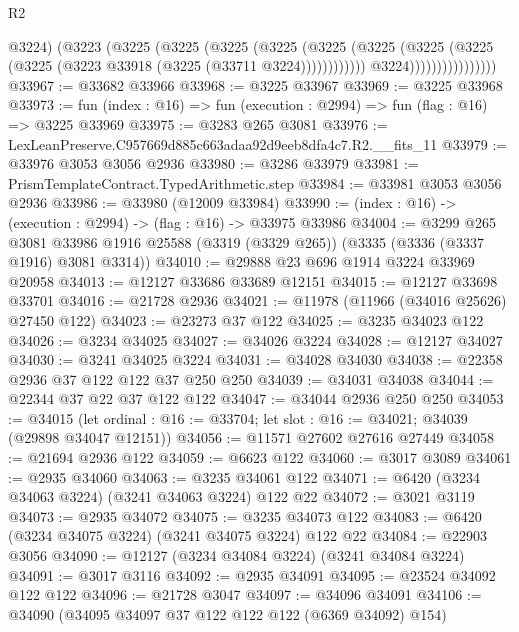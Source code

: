 \begin{lexlean}{R2}
\begin{coremodule}
                                    @3224)
                                  (@3223
                                    (@3225
                                      (@3225
                                        (@3225
                                          (@3225
                                            (@3225
                                              (@3225
                                                (@3225
                                                  (@3225
                                                    (@3225
                                                      (@3223 @33918 (@3225 (@33711 @3224))))))))))))
                                    @3224))))))))))))))))
@33967 := @33682 @33966
@33968 := @3225 @33967
@33969 := @3225 @33968
@33973 := fun (index : @16) => fun (execution : @2994) => fun (flag : @16) => @3225 @33969
@33975 := @3283 @265 @3081
@33976 := LexLeanPreserve.C957669d885c663adaa92d9eeb8dfa4c7.R2.__fits_11
@33979 := @33976 @3053 @3056 @2936
@33980 := @3286 @33979
@33981 := PrismTemplateContract.TypedArithmetic.step
@33984 := @33981 @3053 @3056 @2936
@33986 := @33980 (@12009 @33984)
@33990 := (index : @16) -> (execution : @2994) -> (flag : @16) -> @33975 @33986
@34004 := @3299
    @265
    @3081
    @33986
    @1916
    @25588
    (@3319 (@3329 @265))
    (@3335 (@3336 (@3337 @1916) @3081 @3314))
@34010 := @29888 @23 @696 @1914 @3224 @33969 @20958
@34013 := @12127 @33686 @33689 @12151
@34015 := @12127 @33698 @33701
@34016 := @21728 @2936
@34021 := @11978 (@11966 (@34016 @25626) @27450 @122)
@34023 := @23273 @37 @122
@34025 := @3235 @34023 @122
@34026 := @3234 @34025
@34027 := @34026 @3224
@34028 := @12127 @34027
@34030 := @3241 @34025 @3224
@34031 := @34028 @34030
@34038 := @22358 @2936 @37 @122 @122 @37 @250 @250
@34039 := @34031 @34038
@34044 := @22344 @37 @22 @37 @122 @122
@34047 := @34044 @2936 @250 @250
@34053 := @34015
    (let ordinal : @16 := @33704; let slot : @16 := @34021; @34039 (@29898 @34047 @12151))
@34056 := @11571 @27602 @27616 @27449
@34058 := @21694 @2936 @122
@34059 := @6623 @122
@34060 := @3017 @3089
@34061 := @2935 @34060
@34063 := @3235 @34061 @122
@34071 := @6420 (@3234 @34063 @3224) (@3241 @34063 @3224) @122 @22
@34072 := @3021 @3119
@34073 := @2935 @34072
@34075 := @3235 @34073 @122
@34083 := @6420 (@3234 @34075 @3224) (@3241 @34075 @3224) @122 @22
@34084 := @22903 @3056
@34090 := @12127 (@3234 @34084 @3224) (@3241 @34084 @3224)
@34091 := @3017 @3116
@34092 := @2935 @34091
@34095 := @23524 @34092 @122 @122
@34096 := @21728 @3047
@34097 := @34096 @34091
@34106 := @34090 (@34095 @34097 @37 @122 @122 @122 (@6369 @34092) @154)

\end{coremodule}
\end{lexlean}

